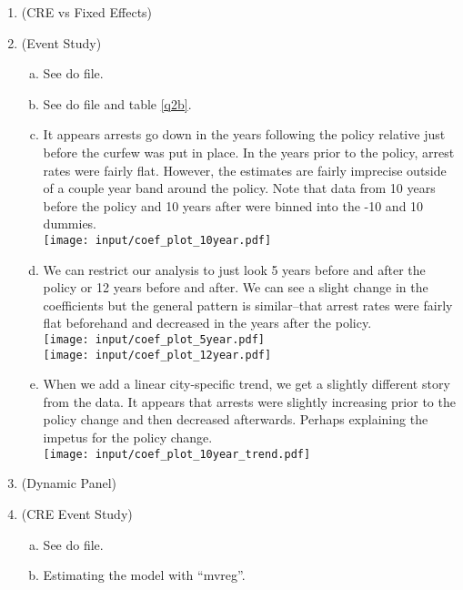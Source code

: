 \documentclass[11pt]{article}
\begin{document}
\begin{center}
\end{center}

\begin{enumerate}[1)]
	\item (CRE vs Fixed Effects)
	\item (Event Study)
	\begin{enumerate}[(a)]
		\item See do file.
		\item See do file and table \ref{q2b}. \\
		
		\item  It appears arrests go down in the years following the policy relative just before the curfew was put in place. In the years prior to the policy, arrest rates were fairly flat. However, the estimates are fairly imprecise outside of a couple year band around the policy. Note that data from 10 years before the policy and 10 years after were binned into the -10 and 10 dummies.\\
		\texttt{[image: input/coef\_plot\_10year.pdf]}
		\item We can restrict our analysis to just look 5 years before and after the policy or 12 years before and after. We can see a slight change in the coefficients but the general pattern is similar--that arrest rates were fairly flat beforehand and decreased in the years after the policy.\\
			\texttt{[image: input/coef\_plot\_5year.pdf]} \\
			\texttt{[image: input/coef\_plot\_12year.pdf]}
		
		\item When we add a linear city-specific trend, we get a slightly different story from the data. It appears that arrests were slightly increasing prior to the policy change and then decreased afterwards. Perhaps explaining the impetus for the policy change. \\
			\texttt{[image: input/coef\_plot\_10year\_trend.pdf]}
	\end{enumerate}
	\item (Dynamic Panel)
	\item (CRE Event Study)
	\begin{enumerate}[(a)]
		\item See do file.
		\item Estimating the model with ``mvreg''.
		\begin{table}
		\centering
		
		\end{table}
	\end{enumerate}
\end{enumerate}
\end{document}
